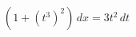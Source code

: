 \documentclass[preview]{standalone}
\begin{document}
\begin{align*}
(1 + (t^3)^2)\, dx = 3t^2\, dt
\end{align*}
\end{document}
